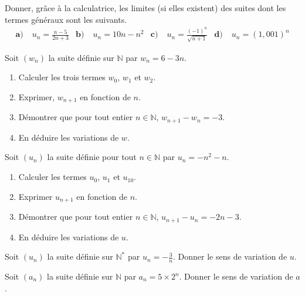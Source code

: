 \documentclass[11pt]{article}
\begin{document}
\begin{exo}
 Donner, gr\^ace à la calculatrice, les limites (si elles existent) des suites
 dont les termes généraux sont les suivants. 
 \begin{align*}
   \textbf{a)}\;& u_n = \frac{n - 5}{2n+3} &
   \textbf{b)}\;& u_n = 10n - n^2 &
   \textbf{c)}\;& u_n = \frac{(-1)^n}{\sqrt{n+1}} &
   \textbf{d)}\;& u_n = (1,001)^n
 \end{align*}
\end{exo}

\vspace{4cm}
\setcounter{exo}{0}
\noindent\begin{minipage}[]{.48\textwidth}
\begin{exo}
  Soit $(w_n)$ la suite définie sur $\mathbb{N}$ par $w_n = 6 - 3n$.
\begin{enumerate}
    \item Calculer les trois termes $w_0$, $w_1$ et $w_2$.
    \item Exprimer, $w_{n+1}$ en fonction de $n$.
    \item Démontrer que pour tout entier $n \in \mathbb{N}$, $w_{n+1} - w_n = -3$.
    \item En déduire les variations de $w$.
\end{enumerate}
\end{exo}
\end{minipage}
\hfill
\begin{minipage}[]{.48\textwidth}
\begin{exo}
  Soit $(u_n)$ la suite définie pour tout $n \in \mathbb{N}$ par $u_n = -n^2-n$.
\begin{enumerate}
    \item Calculer les termes $u_0$, $u_1$ et $u_{10}$.
    \item Exprimer $u_{n+1}$ en fonction de $n$.
    \item Démontrer que pour tout entier $n \in \mathbb{N}$, $u_{n+1} - u_n = -2n
      -3$.
    \item En déduire les variations de $u$.
\end{enumerate}
\end{exo}
\end{minipage}

\begin{exo}
  Soit $(u_n)$ la suite définie sur $\mathbb{N^*}$ par $u_n=-\frac{3}{n}$. Donner
  le sens de variation de $u$.
\end{exo}

\begin{exo}
  Soit $(a_n)$ la suite définie sur $\mathbb{N}$ par $a_n=5\times2^n$. Donner
  le sens de variation de $a$.
\end{exo}
\end{document}
